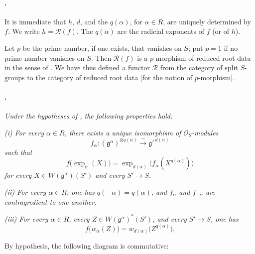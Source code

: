 \paragraph{.}
It is immediate that \(h\), \(d\), and the \(q(\alpha)\), for
\(\alpha\in R\), are uniquely determined by \(f\). We write
\(h=\mathscr R(f)\). The \(q(\alpha)\) are the radicial exponents
of \(f\) \textup{(or of \(h\))}.

Let \(p\) be the prime number, if one exists, that vanishes on
\(S\); put \(p=1\) if no prime number vanishes on \(S\). Then
\(\mathscr R(f)\) is a \(p\)-morphism of reduced root data in the
sense of . We have thus defined a functor
\(\mathscr R\) from the category of split \(S\)-groups to the
category of reduced root data \textup{[for the notion of
\(p\)-morphism]}.

\paragraph{.}
\textit{Under the hypotheses of , the following properties
hold:}

\textit{\textup{(i)} For every \(\alpha\in R\), there exists a
unique isomorphism of \(\mathcal O_S\)-modules}
\[
  f_\alpha:
  (\mathfrak g^\alpha)^{\otimes q(\alpha)}
  \xrightarrow{\;\sim\;}
  \mathfrak g'^{\,d(\alpha)}
\]
\textit{such that}
\[
  f\bigl(\exp_\alpha(X)\bigr)
  =
  \exp_{d(\alpha)}
  \bigl(f_\alpha(X^{q(\alpha)})\bigr)
\]
\textit{for every \(X\in W(\mathfrak g^\alpha)(S')\) and every
\(S'\to S\).}

\textit{\textup{(ii)} For every \(\alpha\in R\), one has
\(q(-\alpha)=q(\alpha)\), and \(f_\alpha\) and \(f_{-\alpha}\) are
contragredient to one another.}

\textit{\textup{(iii)} For every \(\alpha\in R\), every
\(Z\in W(\mathfrak g^\alpha)^*(S')\), and every \(S'\to S\), one
has}
\[
  f\bigl(w_\alpha(Z)\bigr)
  =
  w_{d(\alpha)}\bigl(Z^{q(\alpha)}\bigr).
\]

By hypothesis, the following diagram is commutative:

\begin{center}
  
\end{center}

